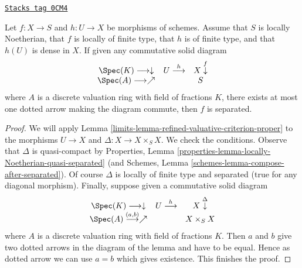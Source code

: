\begin{lemma}
\label{limits-lemma-refined-valuative-criterion-separated}
\href{https://stacks.math.columbia.edu/tag/0CM4}{\texttt{Stacks tag 0CM4}}

Let $f : X \to S$ and $h : U \to X$ be morphisms of schemes.
Assume that $S$ is locally Noetherian, that $f$ is locally of finite type,
that $h$ is of finite type, and that $h(U)$ is dense in $X$.
If given any commutative solid diagram
$$
\begin{array}{ccc}\Spec(K) \longrightarrow\downarrow & U \overset{h}{\longrightarrow} & X \overset{f}{\downarrow} \\ \Spec(A) \longrightarrow\nearrow &  & S\end{array}
$$
where $A$ is a discrete valuation ring with field of fractions $K$, there
exists at most one dotted arrow making the diagram commute, then $f$ is
separated.
\end{lemma}

\begin{proof}

We will apply Lemma \ref{limits-lemma-refined-valuative-criterion-proper}
to the morphisms $U \to X$ and $\Delta : X \to X \times_S X$.
We check the conditions. Observe that $\Delta$ is quasi-compact by
Properties, Lemma \ref{properties-lemma-locally-Noetherian-quasi-separated}
(and Schemes, Lemma \ref{schemes-lemma-compose-after-separated}).
Of course $\Delta$ is locally of finite type and separated (true
for any diagonal morphism).
Finally, suppose given a commutative solid diagram
$$
\begin{array}{ccc}\Spec(K) \longrightarrow\downarrow & U \overset{h}{\longrightarrow} & X \overset{\Delta}{\downarrow} \\ \Spec(A) \overset{(a, b)}{\longrightarrow}\nearrow &  & X \times_S X\end{array}
$$
where $A$ is a discrete valuation ring with field of fractions $K$.
Then $a$ and $b$ give two dotted arrows in the diagram of the lemma
and have to be equal. Hence as dotted arrow we can use $a = b$
which gives existence. This finishes the proof.
\end{proof}

